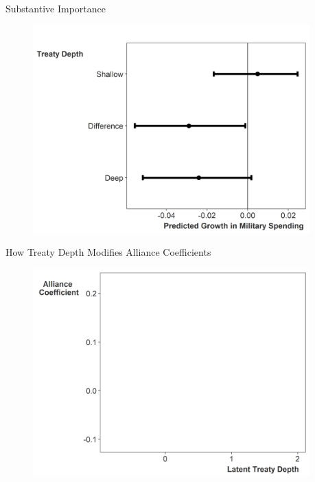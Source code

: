 \documentclass[12pt]{beamer}
\begin{document}

\begin{frame}{Substantive Importance} 

\pause 

\begin{figure}
	\centering
		\includegraphics[width=0.95\textwidth]{pred-impact-depth.png}
\end{figure}

\end{frame}



\begin{frame}{How Treaty Depth Modifies Alliance Coefficients}

\begin{figure}[htbp]
	\centering
		\includegraphics[width=0.95\textwidth]{ld-lambda-blank.png}
	\label{fig:ld-lambda-blank}
\end{figure}


\end{frame}
\end{document}
